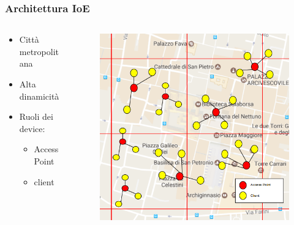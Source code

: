 \documentclass{beamer}
\begin{document}
\begin{frame}
\frametitle{Architettura IoE}
\begin{columns}
\begin{column}{0.4\textwidth}
\begin{itemize}
  \item Città metropolitana
  \item Alta dinamicità
  \item Ruoli dei device:
    \begin{itemize}
    \item Access Point
    \item client
  \end{itemize}
\end{itemize}
\end{column}

\begin{column}{0.4\textwidth}
\begin{figure}
\raggedleft
\includegraphics[width=\columnwidth]{img/arch_general.png}
\end{figure}
\end{column}
\end{columns}
\end{frame}
\end{document}
